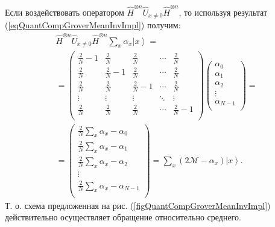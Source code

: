 Если воздействовать оператором $\hat{H}^{\otimes n}\hat{U}_{x \ne
  0}\hat{H}^{\otimes n}$, то используя результат
(\ref{eqQuantCompGroverMeanInvImpl}) получим:
\begin{eqnarray}
\hat{H}^{\otimes n}\hat{U}_{x \ne
  0}\hat{H}^{\otimes n} \sum_x \alpha_x \left| x \right> = 
\nonumber \\
=
\begin{pmatrix}
\frac{2}{N} - 1  & \frac{2}{N} & \frac{2}{N} & \cdots & \frac{2}{N} \\
\frac{2}{N} & \frac{2}{N} - 1 & \frac{2}{N} & \cdots & \frac{2}{N} \\
\frac{2}{N} & \frac{2}{N} & \frac{2}{N} - 1 & \cdots & \frac{2}{N} \\
\vdots & \vdots & \vdots & \ddots & \vdots \\
\frac{2}{N} & \frac{2}{N} & \frac{2}{N} & \cdots & \frac{2}{N} - 1\\
\end{pmatrix}
\begin{pmatrix}
\alpha_0 \\
\alpha_1 \\
\alpha_2 \\
\vdots \\
\alpha_{N - 1} \\
\end{pmatrix}
=
\nonumber \\
=
\begin{pmatrix}
\frac{2}{N}\sum_x\alpha_x - \alpha_0\\
\frac{2}{N}\sum_x\alpha_x - \alpha_1\\
\frac{2}{N}\sum_x\alpha_x - \alpha_2\\
\vdots \\
\frac{2}{N}\sum_x\alpha_x - \alpha_{N-1}\\
\end{pmatrix} = 
\sum_x \left(2 \mathcal{M} - \alpha_x \right)\left| x \right>.
\nonumber
\end{eqnarray}
Т. о. схема предложенная на рис. (\ref{figQuantCompGroverMeanInvImpl})
действительно осуществляет обращение относительно среднего.
